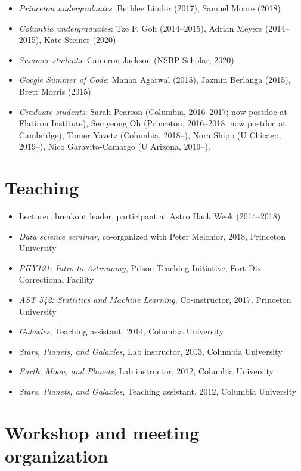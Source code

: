 \documentclass[12pt, letterpaper]{apw-cv}
\begin{document}
\begin{itemize}
    \item \textit{Princeton undergraduates}: Bethlee Lindor (2017), Samuel Moore (2018)
    \item \textit{Columbia undergraduates}: Tze P. Goh (2014--2015), Adrian Meyers (2014--2015), Kate Steiner (2020)
    \item \textit{Summer students}: Cameron Jackson (NSBP Scholar, 2020)
    \item \textit{Google Summer of Code}: Manan Agarwal (2015), Jazmin Berlanga (2015), Brett Morris (2015)
    \item \textit{Graduate students}: Sarah Pearson (Columbia, 2016--2017; now postdoc at Flatiron Institute), Semyeong Oh (Princeton, 2016--2018; now postdoc at Cambridge), Tomer Yavetz (Columbia, 2018--), Nora Shipp (U Chicago, 2019--), Nico Garavito-Camargo (U Arizona, 2019--).
\end{itemize}

\section*{Teaching}

\begin{itemize}
    \item Lecturer, breakout leader, participant at Astro Hack Week (2014--2018)
    \item \emph{Data science seminar}, co-organized with Peter Melchior, 2018, Princeton University
    \item \emph{PHY121: Intro to Astronomy}, Prison Teaching Initiative, Fort Dix Correctional Facility
	\item \emph{AST 542: Statistics and Machine Learning}, Co-instructor, 2017, Princeton University
    \item \emph{Galaxies}, Teaching assistant, 2014, Columbia University
	\item \emph{Stars, Planets, and Galaxies}, Lab instructor, 2013, Columbia University
	\item \emph{Earth, Moon, and Planets}, Lab instructor, 2012, Columbia University
	\item \emph{Stars, Planets, and Galaxies}, Teaching assistant, 2012, Columbia University
\end{itemize}

\section*{Workshop and meeting organization}
\end{document}
